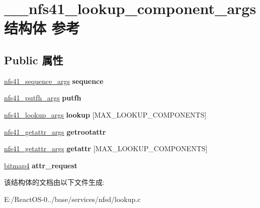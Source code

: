 \hypertarget{struct____nfs41__lookup__component__args}{}\section{\+\_\+\+\_\+nfs41\+\_\+lookup\+\_\+component\+\_\+args结构体 参考}
\label{struct____nfs41__lookup__component__args}
\subsection*{Public 属性}
\begin{DoxyCompactItemize}
\item 
\mbox{\label{struct____nfs41__lookup__component__args_a469e9498cc38293615f0cf400f68eebf}} 
\hyperlink{struct____nfs41__sequence__args}{nfs41\+\_\+sequence\+\_\+args} {\bfseries sequence}
\item 
\mbox{\label{struct____nfs41__lookup__component__args_a1ad630d953f4f4269a3695311ec805d9}} 
\hyperlink{struct____nfs41__putfh__args}{nfs41\+\_\+putfh\+\_\+args} {\bfseries putfh}
\item 
\mbox{\label{struct____nfs41__lookup__component__args_a2dc6d5f25254d56d2e50186a7aa0ea34}} 
\hyperlink{struct____nfs41__lookup__args}{nfs41\+\_\+lookup\+\_\+args} {\bfseries lookup} \mbox{[}M\+A\+X\+\_\+\+L\+O\+O\+K\+U\+P\+\_\+\+C\+O\+M\+P\+O\+N\+E\+N\+TS\mbox{]}
\item 
\mbox{\label{struct____nfs41__lookup__component__args_ab2e969ba3db57396ec562ffc111874d6}} 
\hyperlink{struct____nfs41__getattr__args}{nfs41\+\_\+getattr\+\_\+args} {\bfseries getrootattr}
\item 
\mbox{\label{struct____nfs41__lookup__component__args_ab6abf8ca762105b8f6a4b69312fe5647}} 
\hyperlink{struct____nfs41__getattr__args}{nfs41\+\_\+getattr\+\_\+args} {\bfseries getattr} \mbox{[}M\+A\+X\+\_\+\+L\+O\+O\+K\+U\+P\+\_\+\+C\+O\+M\+P\+O\+N\+E\+N\+TS\mbox{]}
\item 
\mbox{\label{struct____nfs41__lookup__component__args_a43d9e6aaf54e5d1723a900eb5a7b8322}} 
\hyperlink{struct____bitmap4}{bitmap4} {\bfseries attr\+\_\+request}
\end{DoxyCompactItemize}


该结构体的文档由以下文件生成\+:\begin{DoxyCompactItemize}
\item 
E\+:/\+React\+O\+S-\/0../base/services/nfsd/lookup.\+c\end{DoxyCompactItemize}
